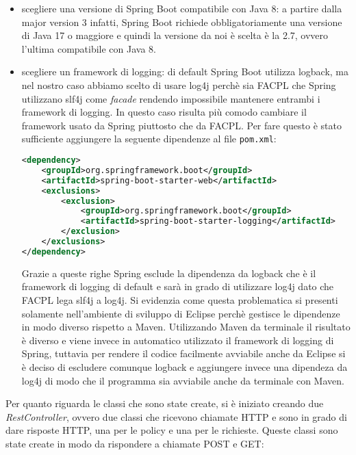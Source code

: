 \begin{itemize}
    \item scegliere una versione di Spring Boot compatibile con Java 8: a partire dalla major version 3 infatti, Spring Boot richiede obbligatoriamente una versione di Java 17 o maggiore e quindi la versione da noi è scelta è la 2.7, ovvero l'ultima compatibile con Java 8.
    \item scegliere un framework di logging: di default Spring Boot utilizza logback, ma nel nostro caso abbiamo scelto di usare log4j perchè sia FACPL che Spring utilizzano slf4j come \emph{facade} rendendo impossibile mantenere entrambi i framework di logging. In questo caso risulta più comodo cambiare il framework usato da Spring piuttosto che da FACPL. Per fare questo è stato sufficiente aggiungere la seguente dipendenze al file \texttt{pom.xml}:
    \begin{lstlisting}[language=XML, xleftmargin=1em, caption=Esclusione di logback, label=code:noLogback]
<dependency>
    <groupId>org.springframework.boot</groupId>
    <artifactId>spring-boot-starter-web</artifactId>
    <exclusions>
        <exclusion>
            <groupId>org.springframework.boot</groupId>
            <artifactId>spring-boot-starter-logging</artifactId>
        </exclusion>
    </exclusions>
</dependency>
    \end{lstlisting}
    Grazie a queste righe Spring esclude la dipendenza da logback che è il framework di logging di default e sarà in grado di utilizzare log4j dato che FACPL lega slf4j a log4j. Si evidenzia come questa problematica si presenti solamente nell'ambiente di sviluppo di Eclipse perchè gestisce le dipendenze in modo diverso rispetto a Maven. Utilizzando Maven da terminale il risultato è diverso e viene invece in automatico utilizzato il framework di logging di Spring, tuttavia per rendere il codice facilmente avviabile anche da Eclipse si è deciso di escludere comunque logback e aggiungere invece una dipendeza da log4j di modo che il programma sia avviabile anche da terminale con Maven.
\end{itemize}
Per quanto riguarda le classi che sono state create, si è iniziato creando due \emph{RestController}, ovvero due classi che ricevono chiamate HTTP e sono in grado di dare risposte HTTP, una per le policy e una per le richieste. Queste classi sono state create in modo da rispondere a chiamate POST e GET:
